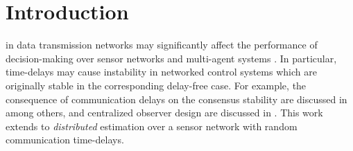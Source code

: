 \documentclass[journal]{IEEEtran}
\newcommand{\tb}{\color{blue}}
\begin{document}


\section{Introduction} \label{sec_intro}
 in data transmission networks may significantly affect the performance of decision-making over sensor networks and multi-agent systems \cite{HOFBAUER}. In particular, time-delays may cause instability in networked control systems which are originally stable in the corresponding delay-free case. For example, the consequence of communication delays on the consensus stability  are discussed in \cite{Themis_delay,sharifi2020finite,ghaedsharaf2021centrality} among others, 
and centralized observer design 
are  discussed in \cite{sundaram2007delayed,schenato2006optimal}. This work extends to \textit{distributed} estimation over a sensor network with random communication time-delays.
\end{document}
